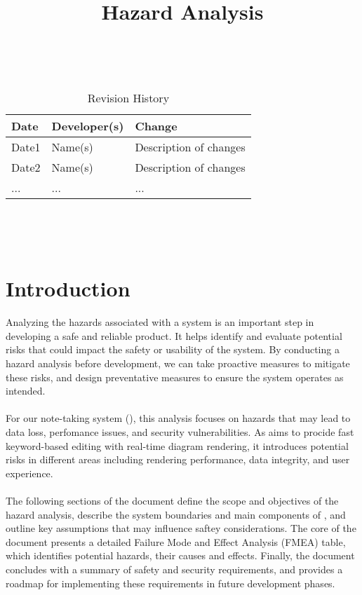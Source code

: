 \documentclass{article}
\title{Hazard Analysis\\\progname}
\author{\authname}
\date{}
\begin{document}
\maketitle
\thispagestyle{empty}

~\newpage


\begin{table}[hp]
\caption{Revision History} \label{TblRevisionHistory}
\begin{tabularx}{\textwidth}{llX}
\toprule
\textbf{Date} & \textbf{Developer(s)} & \textbf{Change}\\
\midrule
Date1 & Name(s) & Description of changes\\
Date2 & Name(s) & Description of changes\\
... & ... & ...\\
\bottomrule
\end{tabularx}
\end{table}

~\newpage

\tableofcontents

~\newpage



\section{Introduction}


Analyzing the hazards associated with a system is an important step in
developing a safe and reliable product. It helps identify and evaluate
potential risks that could impact the safety or usability of the system. By
conducting a hazard analysis before development, we can take proactive measures
to mitigate these risks, and design preventative measures to ensure the system
operates as intended.
\\
\\
For our note-taking system (\progname), this analysis focuses on hazards that 
may lead to data loss, perfomance issues, and security vulnerabilities. As 
\progname aims to procide fast keyword-based editing with real-time diagram
rendering, it introduces potential risks in different areas including rendering
performance, data integrity, and user experience.
\\
\\
The following sections of the document define the scope and objectives of the 
hazard analysis, describe the system boundaries and main components of 
\progname, and outline key assumptions that may influence saftey considerations.
The core of the document presents a detailed Failure Mode and Effect Analysis
(FMEA) table, which identifies potential hazards, their causes and effects.
Finally, the document concludes with a summary of safety and security
requirements, and provides a roadmap for implementing these requirements in
future development phases.
\end{document}
